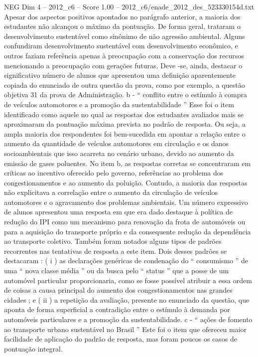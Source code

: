 \begin{textsample}{NEG Dim 4 – 2012\_c6 – Score 1.00 – 2012\_c6/enade\_2012\_des\_523330154d.txt}
Apesar dos aspectos positivos apontados no parágrafo anterior, a maioria dos estudantes não alcançou o máximo da pontuação.
De forma geral, trataram o desenvolvimento sustentável como sinônimo de não agressão ambiental.
Alguns confundiram desenvolvimento sustentável com desenvolvimento econômico, e outros faziam referência apenas à preocupação com a conservação dos recursos mencionando a preocupação com gerações futuras.
Deve -se, ainda, destacar o significativo número de alunos que apresentou uma definição aparentemente copiada do enunciado de outra questão da prova, como por exemplo, a questão objetiva 31 da prova de Administração. b - “ conflito entre o estímulo à compra de veículos automotores e a promoção da sustentabilidade ” Esse foi o item identificado como aquele no qual as respostas dos estudantes avaliados mais se aproximaram da pontuação máxima prevista no padrão de resposta.
Ou seja, a ampla maioria dos respondentes foi bem-sucedida em apontar a relação entre o aumento da quantidade de veículos automotores em circulação e os danos socioambientais que isso acarreta no cenário urbano, devido ao aumento da emissão de gases poluentes.
No item b, as respostas corretas se concentraram em críticas ao incentivo oferecido pelo governo, referências ao problema dos congestionamentos e ao aumento da poluição.
Contudo, a maioria das respostas não explicitava a correlação entre o aumento da circulação de veículos automotores e o agravamento dos problemas ambientais.
Um número expressivo de alunos apresentou uma resposta em que era dado destaque à política de redução do IPI como um mecanismo para renovação da frota de automóveis ou para a aquisição do transporte próprio e da consequente redução da dependência ao transporte coletivo.
Também foram notados alguns tipos de padrões recorrentes nas tentativas de resposta a este item.
Dois desses padrões se destacaram : ( i ) as declarações genéricas de condenação do “ consumismo ” de uma “ nova classe média ” ou da busca pelo “ status ” que a posse de um automóvel particular proporcionaria, como se fosse possível atribuir a essa ordem de coisas a causa principal do aumento dos congestionamentos nas grandes cidades ; e ( ii ) a repetição da avaliação, presente no enunciado da questão, que aponta de forma superficial a contradição entre o estímulo à demanda por automóveis particulares e a promoção da sustentabilidade. c - “ ações de fomento ao transporte urbano sustentável no Brasil ” Este foi o item que ofereceu maior facilidade de aplicação do padrão de resposta, mas foram poucos os casos de pontuação integral.

\end{textsample}
